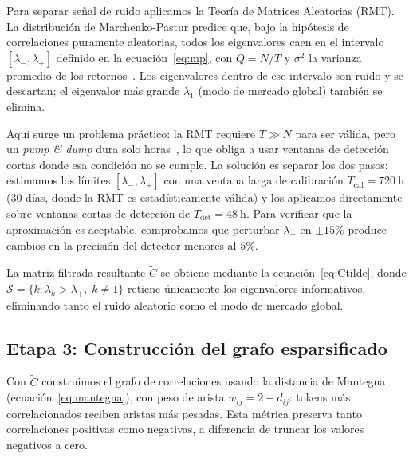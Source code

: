 Para separar señal de ruido aplicamos la Teoría de Matrices Aleatorias
(RMT). La distribución de Marchenko-Pastur predice que, bajo la hipótesis
de correlaciones puramente aleatorias, todos los eigenvalores caen en el
intervalo $[\lambda_-, \lambda_+]$ definido en la ecuación~\eqref{eq:mp},
con $Q = N/T$ y $\sigma^2$ la varianza promedio de los
retornos~\cite{plerou1999}. Los eigenvalores dentro de ese intervalo son
ruido y se descartan; el eigenvalor más grande $\lambda_1$ (modo de
mercado global) también se elimina.

Aquí surge un problema práctico: la RMT requiere $T \gg N$ para ser
válida, pero un \emph{pump \& dump} dura solo horas~\cite{lamorgia2020},
lo que obliga a usar ventanas de detección cortas donde esa condición
no se cumple. La solución es separar los dos pasos: estimamos los
límites $[\lambda_-, \lambda_+]$ con una ventana larga de calibración
$T_{\text{cal}} = 720~\text{h}$ (30 días, donde la RMT es
estadísticamente válida) y los aplicamos directamente sobre ventanas
cortas de detección de $T_{\text{det}} = 48~\text{h}$. Para verificar
que la aproximación es aceptable, comprobamos que perturbar $\lambda_+$
en ${\pm}15\%$ produce cambios en la precisión del detector menores
al $5\%$.

La matriz filtrada resultante $\tilde{C}$ se obtiene mediante la
ecuación~\eqref{eq:Ctilde}, donde $\mathcal{S} = \{k : \lambda_k >
\lambda_+,\; k \neq 1\}$ retiene únicamente los eigenvalores
informativos, eliminando tanto el ruido aleatorio como el modo de
mercado global.

\subsection{Etapa 3: Construcción del grafo esparsificado}

Con $\tilde{C}$ construimos el grafo de correlaciones usando la distancia
de Mantegna~\cite{mantegna1999} (ecuación~\eqref{eq:mantegna}), con peso
de arista $w_{ij} = 2 - d_{ij}$: tokens más correlacionados reciben
aristas más pesadas. Esta métrica preserva tanto correlaciones positivas
como negativas, a diferencia de truncar los valores negativos a cero.

